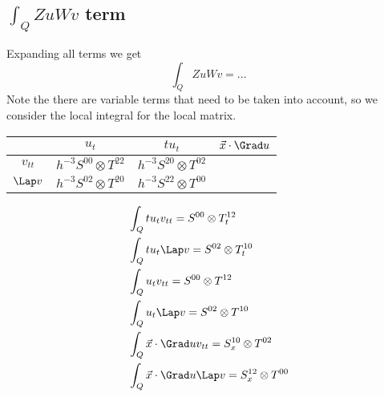 \documentclass[]{report}
\begin{document}
    \subsection*{$\int_Q {Z}u {W}v$ term}
    Expanding all terms we get
    \begin{equation*}
        \int_Q Zu Wv = ...
    \end{equation*}
    Note the there are variable terms that need to be taken into account, so we consider the local integral for the local matrix.
    \begin{center}
        \begin{tabular}[]{|c||c|c|c|}
            \hline
                        & $u_{t}$ & $t u_t$ & $\vec{x} \cdot \Grad u$ \\
            \hline \hline
            $v_{tt}$    & $h^{-3} S^{00} \otimes T^{22}$ & $h^{-3} S^{20} \otimes T^{02}$ \\
            \hline
            $\Lap v$    & $h^{-3} S^{02} \otimes T^{20}$ & $h^{-3} S^{22} \otimes T^{00}$ \\
            \hline
        \end{tabular}
    \end{center}

    \begin{align*}
        &\int_Q t u_t v_{tt} = S^{00} \otimes T^{12}_t \\
        &\int_Q t u_t \Lap v = S^{02} \otimes T^{10}_t \\
        &\int_Q u_t v_{tt} = S^{00} \otimes T^{12} \\
        &\int_Q u_t \Lap v = S^{02} \otimes T^{10} \\
        &\int_Q \vec{x} \cdot \Grad u v_{tt} = S^{10}_x \otimes T^{02} \\
        &\int_Q \vec{x} \cdot \Grad u \Lap v = S^{12}_x \otimes T^{00}
    \end{align*}
\end{document}

